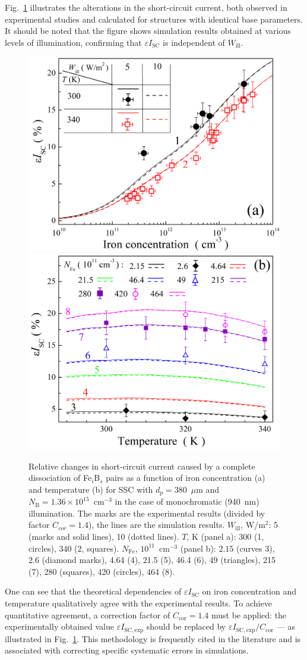 \documentclass[a4paper,fleqn]{cas-sc}
\begin{document}
Fig.~\ref{fig5} illustrates the alterations in the short-circuit current,
both observed in experimental studies and calculated for structures with identical base parameters.
It should be noted that the figure shows simulation results obtained at various levels of illumination,
confirming that $\varepsilon I_\mathrm{SC}$ is independent of $W_\mathrm{ill}$.


\begin{figure}
	\centering
     \includegraphics[width=0.4\linewidth]{Fig5a.png}
     \includegraphics[width=0.4\linewidth]{Fig5b.png}
	  \caption{Relative changes in short-circuit current caused by a complete
       dissociation of Fe$_i$B$_s$ pairs as a function of iron concentration (a) and
       temperature (b) for SSC with $d_p=380$~$\mu$m and $N_\mathrm{B}=1.36\times10^{15}$~cm$^{-3}$
       in the case of monochromatic (940~nm) illumination.
       The marks are the experimental results (divided by factor $C_{cor}=1.4$), the lines are the simulation results.
       $W_\mathrm{ill}$, W/m$^{2}$: 5 (marks and solid lines), 10 (dotted lines).
       $T$, K (panel a): 300 (1, circles), 340 (2, squares).
       $N_\mathrm{Fe}$, $10^{11}$~cm$^{-3}$ (panel b): 2.15 (curves 3), 2.6 (diamond marks), 4.64 (4),
       21.5 (5), 46.4 (6), 49 (triangles), 215 (7), 280 (squares), 420 (circles), 464 (8).
}\label{fig5}
\end{figure}

One can see that the theoretical dependencies of $\varepsilon I_\mathrm{SC}$
on iron concentration and temperature qualitatively agree with the experimental results.
To achieve quantitative agreement, a correction factor of $C_\mathrm{cor} = 1.4$ must be applied:
the experimentally obtained value $\varepsilon I_\mathrm{SC,exp}$ should be replaced by $\varepsilon I_\mathrm{SC,exp} / C_\mathrm{cor}$ --- as illustrated in Fig.~\ref{fig5}.
This methodology is frequently cited in the literature \cite{IronSC} and is associated with correcting specific systematic errors in simulations.
\end{document}
